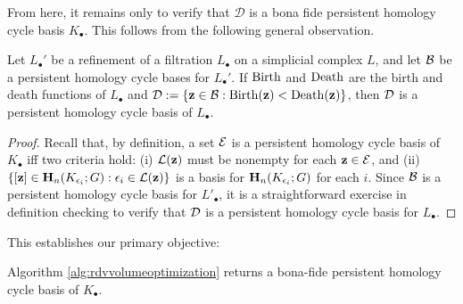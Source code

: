 \documentclass[utf8]{frontiers_suppmat} %
\begin{document}
From here, it remains only to verify that $\mathcal D$ is a bona fide persistent homology cycle basis $K_\bullet$.  This follows from the following general observation.



\begin{theorem}
Let $L_\bullet'$ be a refinement of a filtration $L_\bullet$ on a simplicial complex $L$, and let $\mathcal B$ be a persistent homology cycle bases for $L_\bullet'$.  If $\mathrm{Birth}$ and $\mathrm{Death}$ are the birth and death functions of $L_\bullet$ and ${\mathcal D}: = \{{\mathbf z} \in \mathcal B : \mathrm{Birth}({\mathbf z}) < \mathrm{Death}({\mathbf z}) \}$, then $\mathcal D$ is a persistent homology cycle basis of $L_\bullet$.
\end{theorem}
\begin{proof}
Recall that, by definition, a set $\mathcal E$ is a persistent homology cycle basis of $K_\bullet$ iff two criteria hold: (i) $\mathcal{L}({\mathbf z})$ must be nonempty for each ${\mathbf z} \in \mathcal E$, and (ii) $\{ [{\mathbf z}]\in \mathbf{H}_n(K_{\epsilon_i}; G) : \epsilon_i \in \mathcal{L}({\mathbf z}) \}$ is a basis for $\mathbf{H}_n(K_{\epsilon_i}; G)$ for each $i$.  Since $\mathcal B$ is a persistent homology cycle basis for $L'_\bullet$, it is a straightforward exercise in definition checking to verify that $\mathcal D$ is a persistent homology cycle basis for $L_\bullet$.
\end{proof}


This establishes our primary objective:

\begin{theorem}
Algorithm \ref{alg:rdvvolumeoptimization} returns a bona-fide persistent homology cycle basis of $K_\bullet$.
\end{theorem}





\end{document}
